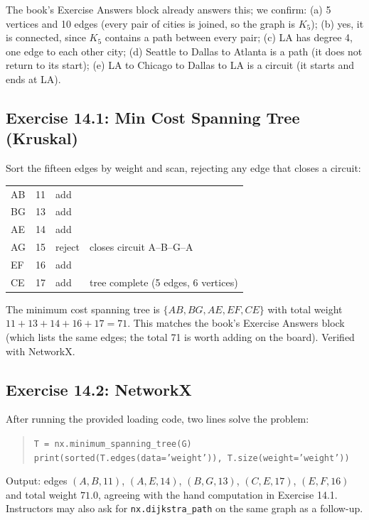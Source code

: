 The book's Exercise Answers block already answers this; we confirm: (a) 5 vertices and 10 edges (every pair of cities is joined, so the graph is $K_5$); (b) yes, it is connected, since $K_5$ contains a path between every pair; (c) LA has degree 4, one edge to each other city; (d) Seattle to Dallas to Atlanta is a path (it does not return to its start); (e) LA to Chicago to Dallas to LA is a circuit (it starts and ends at LA).

\subsection*{Exercise 14.1: Min Cost Spanning Tree (Kruskal)}

Sort the fifteen edges by weight and scan, rejecting any edge that closes a circuit:
\begin{center}
\begin{tabular}{llll}
AB & 11 & add & \\
BG & 13 & add & \\
AE & 14 & add & \\
AG & 15 & reject & closes circuit A--B--G--A \\
EF & 16 & add & \\
CE & 17 & add & tree complete (5 edges, 6 vertices) \\
\end{tabular}
\end{center}
The minimum cost spanning tree is $\{AB, BG, AE, EF, CE\}$ with total weight $11 + 13 + 14 + 16 + 17 = 71$. This matches the book's Exercise Answers block (which lists the same edges; the total 71 is worth adding on the board). Verified with NetworkX.

\subsection*{Exercise 14.2: NetworkX}

After running the provided loading code, two lines solve the problem:
\begin{quote}
\texttt{T = nx.minimum\_spanning\_tree(G)} \\
\texttt{print(sorted(T.edges(data='weight')), T.size(weight='weight'))}
\end{quote}
Output: edges $(A,B,11)$, $(A,E,14)$, $(B,G,13)$, $(C,E,17)$, $(E,F,16)$ and total weight $71.0$, agreeing with the hand computation in Exercise 14.1. Instructors may also ask for \texttt{nx.dijkstra\_path} on the same graph as a follow-up.

